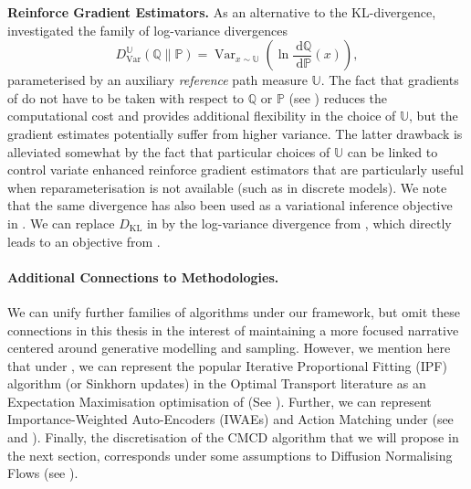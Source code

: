 \textbf{Reinforce Gradient Estimators.} As an alternative to the KL-divergence, \textcite{nusken2021solving} investigated the family of log-variance divergences\label{ntn:log_variance_divergence}
\[
D_{\operatorname{Var}}^{\mathbb{U}}\left(\mathbb{Q} \| \mathbb{P}\right)=\operatorname{Var}_{x \sim \mathbb{U}}\left(\ln \frac{\mathrm{~d} \mathbb{Q}}{\mathrm{~d} \mathbb{P}}(x)\right), \label{eq:logvar}
\]
parameterised by an auxiliary \emph{reference} path measure $\mathbb{U}$. The fact that gradients of  do not have to be taken with respect to $\mathbb{Q}$ or $\mathbb{P}$ (see \textcite{nusken2021solving, richter2020vargrad}) reduces the computational cost and provides additional flexibility in the choice of $\mathbb{U}$, but the gradient estimates potentially suffer from higher variance. The latter drawback is alleviated somewhat by the fact that particular choices of $\mathbb{U}$ can be linked to control variate enhanced reinforce gradient estimators \parencite{richter2020vargrad} that are particularly useful when reparameterisation is not available (such as in discrete models). We note that the same divergence has also been used as a variational inference objective in \textcite{el2012bayesian}. We can replace $D_{\mathrm{KL}}$ in  by the log-variance divergence from , which directly leads to an objective from \textcite[Section 3.2]{nusken2021solving}.

\paragraph{Additional Connections to Methodologies.} We can unify further families of algorithms under our framework, but omit these connections in this thesis in the interest of maintaining a more focused narrative centered around generative modelling and sampling. However, we mention here that under , we can represent the popular Iterative Proportional Fitting (IPF) algorithm (or Sinkhorn updates) in the Optimal Transport literature \parencite{fortet1940resolution,kullback1968probability,ruschendorf1995convergence, cuturi2013sinkhorn} as an Expectation Maximisation optimisation of  (See \textcite[Proposition 3.1]{vargas2023transport}). Further, we can represent Importance-Weighted Auto-Encoders (IWAEs) \parencite{burda2015importance} and Action Matching \parencite{neklyudov2022action} under  (see \textcite[Equation (34)]{vargas2023transport} and \textcite[Appendix C.4]{vargas2023transport}). Finally, the discretisation of the CMCD algorithm that we will propose in the next section, corresponds under some assumptions to Diffusion Normalising Flows \parencite{zhang2021diffusion} (see \textcite[See Appendix E.1.1]{vargas2023transport}).

